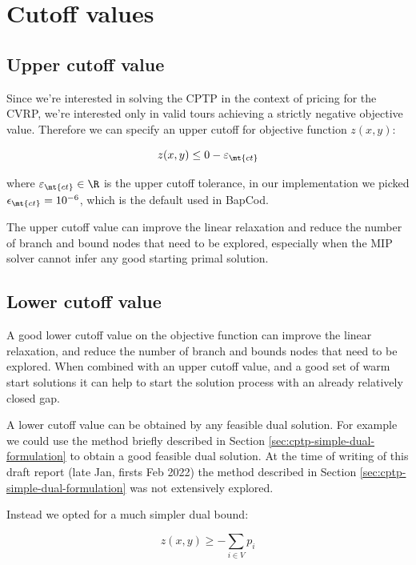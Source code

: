 \section{Cutoff values}


\subsection{Upper cutoff value}
Since we're interested in solving the CPTP in the context of pricing for the CVRP, we're interested only in valid tours achieving a strictly negative objective value.
Therefore we can specify an upper cutoff for objective function $z(x, y)$:

\begin{equation}
	z(x, y) \le 0 - \varepsilon_{\mt{ct}}
\end{equation}

where $\varepsilon_{\mt{ct}} \in \R$ is the upper cutoff tolerance, in our implementation we picked $\epsilon_{\mt{ct}} = 10^{-6}$, which is the default used in BapCod.

The upper cutoff value can improve the linear relaxation and reduce the number of branch and bound nodes that need to be explored, especially when the MIP solver cannot infer any good starting primal solution.

\subsection{Lower cutoff value}
A good lower cutoff value on the objective function can improve the linear relaxation, and reduce the number of branch and bounds nodes that need to be explored.
When combined with an upper cutoff value, and a good set of warm start solutions it can help to start the solution process with an already relatively closed gap.

A lower cutoff value can be obtained by any feasible dual solution.
For example we could use the method briefly described in Section \ref{sec:cptp-simple-dual-formulation} to obtain a good feasible dual solution.
At the time of writing of this draft report (late Jan, firsts Feb 2022) the method described in Section \ref{sec:cptp-simple-dual-formulation} was not extensively explored.

Instead we opted for a much simpler dual bound:

\begin{equation}
	z(x, y) \ge - \sum_{i \in V} p_i
\end{equation}

